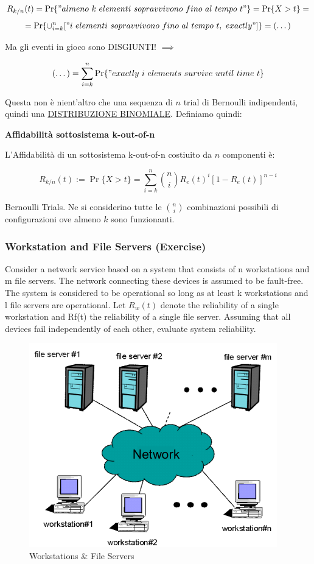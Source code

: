 \[
	R_{k/n}(t) = \Pr\{"almeno\ k\ elementi\ sopravvivono\ fino\ al\ tempo\ t"\} = \Pr\{X > t\} =
\]
\[
	= \Pr\{\cup_{i=k}^n{["i\ elementi\ sopravvivono\ fino\ al\ tempo\ t,\ exactly"]}\} = (\dots)
\]

Ma gli eventi in gioco sono DISGIUNTI! $\implies$

\[
	(\dots) = \sum_{i=k}^n{\Pr\{"exactly\ i\ elements\ survive\ until\ time\ t\}}
\]

Questa non è nient'altro che una sequenza di $n$ trial di Bernoulli indipendenti, quindi una \underline{DISTRIBUZIONE BINOMIALE}. Definiamo quindi:

\begin{defn}{\textbf{Affidabilità sottosistema k-out-of-n}}

L'Affidabilità di un sottosistema k-out-of-n costiuito da $n$ componenti è:

\[
	R_{k/n}(t) := \Pr\{X > t\} = \sum_{i=k}^n{\binom{n}{i}R_e(t)^i[1-R_e(t)]^{n-i}}
\]

\end{defn}

Bernoulli Trials. Ne si considerino tutte le $\binom{n}{i}$ combinazioni possibili di configurazioni ove almeno $k$ sono funzionanti. 

\subsubsection{Workstation and File Servers (Exercise)}

Consider a network service based on a system that consists of n workstations and m file servers. The network connecting these devices is assumed to be fault-free. The system is considered to be operational so long as at least k workstations and l file servers are operational. Let $R_w(t)$ denote the reliability of a single workstation and Rf(t) the reliability of a single file server. Assuming that all devices fail independently of each other, evaluate system reliability. 

\begin{center}
\begin{figure}[H]
\centering
\includegraphics[scale=1]{figures/ex/ws&fs.png}
\caption{Workstations \& File Servers}
\end{figure}
\end{center}

